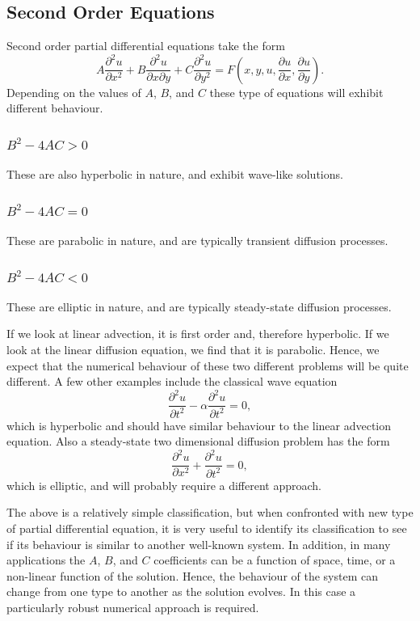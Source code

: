 \subsection{Second Order Equations}
Second order partial differential equations take the form
\begin{equation}
	A \frac{\partial^2 u}{\partial x^2} + B \frac{\partial^2 u}{\partial x \partial y} + C \frac{\partial^2 u}{\partial y^2} = F(x,y,u,\frac{\partial u}{\partial x},\frac{\partial u}{\partial y}).
\end{equation}
Depending on the values of $A$, $B$, and $C$ these type of equations will exhibit different behaviour.

\subsubsection{$B^2-4AC > 0$}
These are also hyperbolic in nature, and exhibit wave-like solutions.

\subsubsection{$B^2-4AC = 0$}
These are parabolic in nature, and are typically transient diffusion processes.

\subsubsection{$B^2-4AC < 0$}
These are elliptic in nature, and are typically steady-state diffusion processes.

If we look at linear advection, it is first order and, therefore hyperbolic. If we look at the linear diffusion equation, we find that it is parabolic. Hence, we expect that the numerical behaviour of these two different problems will be quite different. A few other examples include the classical wave equation
\begin{equation}
	\frac{\partial^2 u}{\partial t^2} - \alpha\frac{\partial^2 u}{\partial t^2} = 0,
\end{equation}
which is hyperbolic and should have similar behaviour to the linear advection equation. Also a steady-state two dimensional diffusion problem has the form
\begin{equation}
	\frac{\partial^2 u}{\partial x^2} + \frac{\partial^2 u}{\partial t^2} = 0,
\end{equation}
which is elliptic, and will probably require a different approach.

The above is a relatively simple classification, but when confronted with new type of partial differential equation, it is very useful to identify its classification to see if its behaviour is similar to another well-known system. In addition, in many applications the $A$, $B$, and $C$ coefficients can be a function of space, time, or a non-linear function of the solution. Hence, the behaviour of the system can change from one type to another as the solution evolves. In this case a particularly robust numerical approach is required.
 
